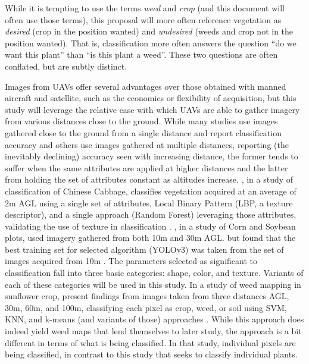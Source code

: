 \documentclass[letterpaper]{article}
\begin{document}
 While it is tempting to use the terms \textit{weed} and \textit{crop} (and this document will often use those terms), this proposal will more often reference vegetation as \textit{desired} (crop in the position wanted) and \textit{undesired} (weeds and crop not in the position wanted).  That is, classification more often answers the question ``do we want this plant'' than ``is this plant a weed''. These two questions are often conflated, but are subtly distinct.

 Images from UAVs offer several advantages over those obtained with manned aircraft and satellite, such as the economics or flexibility of acquisition, but this study will leverage the relative ease with which UAVs are able to gather imagery from various distances close to the ground. While many studies use images gathered close to the ground from a single distance and report classification accuracy and others use images gathered at multiple distances, reporting (the inevitably declining) accuracy seen with increasing distance, the former tends to suffer when the same attributes are applied at higher distances and the latter from holding the set of attributes constant as altitudes increase. \citeauthor{Ong2023-lm}, in a study of classification of Chinese Cabbage, classifies vegetation acquired at an average of 2m AGL using a single set of attributes, Local Binary Pattern (LBP, a texture descriptor), and a single approach (Random Forest) leveraging those attributes, validating the use of texture in classification \parencite{Ong2023-lm}. \citeauthor{Etienne2021-ik}, in a study of Corn and Soybean plots, used imagery gathered from both 10m and 30m AGL. but found that the best training set for selected algorithm (YOLOv3) was taken from the set of images acquired from 10m \parencite{Etienne2021-ik}. The parameters selected as significant to classification fall into three basic categories: shape, color, and texture. Variants of each of these categories will be used in this study. 
In a study of weed mapping in sunflower crop, \citeauthor{Perez-Ortiz2015-yk} present findings from images taken from three distances AGL, 30m, 60m, and 100m, classifying each pixel as crop, weed, or soil using SVM, KNN, and k-means (and variants of those) approaches \parencite{Perez-Ortiz2015-yk}. While this approach does indeed yield weed maps that lend themselves to later study, the approach is a bit different in terms of what is being classified. In that study, individual pixels are being classified, in contrast to this study that seeks to classify individual plants.
\end{document}
